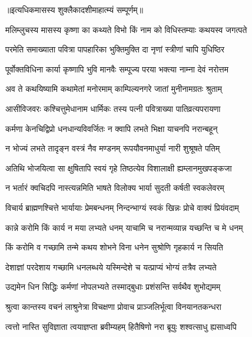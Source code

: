 ॥इत्यधिकमासस्य शुक्लैकादशीमाहात्म्यं सम्पूर्णम्॥



\twolineshloka
{मलिम्लुचस्य मासस्य कृष्णा का कथ्यते विभो}
{किं नाम को विधिस्तम्याः कथयस्व जगत्पते} %


\twolineshloka
{परमेति समाख्याता पवित्रा पापहारिका}
{भुक्तिमुक्ति दा नृणां स्त्रीणां चापि युधिष्ठिर} %

\twolineshloka
{पूर्वोक्तविधिना कार्या कृष्णापि भुवि मानवैः}
{सम्पूज्य परया भक्त्या नाम्ना देवं नरोत्तम} %

\twolineshloka
{अव ते कथयिष्यामि कथामेतां मनोरमाम्}
{काम्पिल्यनगरे जातां मुनीनामग्रतः श्रुताम्} %

\twolineshloka
{आसीविजवरः कश्चित्तुमेधानाम धार्मिकः}
{तस्य पत्नी पवित्राख्या पातिव्रत्यपरायणा} %

\twolineshloka
{कर्मणा केनचिद्विप्रो धनधान्यविवर्जितः}
{न क्वापि लभते भिक्षा याचनपि नरान्बहून्} %

\twolineshloka
{न भोज्यं लभते तादृङ्न वस्त्रं नैव मण्डनम्}
{रूपयौवनमाधुर्या नारी शुश्रूषते पतिम्} %

\twolineshloka
{अतिथि भोजयित्वा सा क्षुषितापि स्वयं गृहे}
{तिष्ठत्येव विशालाक्षी ह्यम्लानमुखपङ्कजा} %

\twolineshloka
{न भर्तारं क्वचिदपि नास्त्यन्नमिति भाषते}
{विलोक्य भार्या सुदती कर्षती स्वकलेवरम्} %

\twolineshloka
{विचार्य ब्राह्मणश्चित्ते भार्यायाः प्रेमबन्धनम्}
{निन्दन्भाग्यं स्वकं खिन्नः प्रोचे वाक्यं प्रियंवदाम्} %

\twolineshloka
{कान्ने करोमि किं कार्य न मया लभ्यते धनम्}
{याचामि च नरान्मव्यान्न यच्छन्ति च मे धनम्} %

\twolineshloka
{किं करोमि व गच्छामि तन्मे कथय शोभने}
{विना धनेन सुश्रोणि गृहकार्य न सियति} %

\twolineshloka
{देशाज्ञां परदेशाय गच्छामि धनलब्धये}
{यस्मिन्देशे च यत्प्राप्यं भोग्यं तत्रैव लभ्यते} %

\twolineshloka
{उद्यमेन धिन सिद्धिः कर्मणां नोपलभ्यते}
{तस्माद्बुधाः प्रशंसन्ति सर्वथैव शुभोद्यमम्} %

\twolineshloka
{श्रुत्वा कान्तस्य वचनं लाश्रुनेत्रा विचक्षणा}
{प्रोवाच प्राञ्जलिर्भूत्वा विनयानतकन्धरा} %

\twolineshloka
{त्वत्तो नास्ति सुविज्ञाता त्वयाज्ञप्ता ब्रवीम्यहम्}
{हितैषिणो नरा ब्रूयुः शश्वत्साधु ह्यसाध्वपि} %

